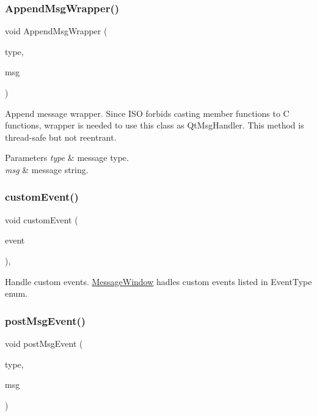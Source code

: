 \subsubsection{\texorpdfstring{AppendMsgWrapper()}{AppendMsgWrapper()}}
{\footnotesize\ttfamily void Append\+Msg\+Wrapper (\begin{DoxyParamCaption}\item[{Qt\+Msg\+Type}]{type,  }\item[{const char $\ast$}]{msg }\end{DoxyParamCaption})\hspace{0.3cm}{\ttfamily [static]}}

Append message wrapper. Since I\+SO forbids casting member functions to C functions, wrapper is needed to use this class as Qt\+Msg\+Handler. This method is thread-\/safe but not reentrant. 
\begin{DoxyParams}{Parameters}
{\em type} & message type. \\
\hline
{\em msg} & message string. \\
\hline
\end{DoxyParams}
\mbox{\label{class_message_window_a51bccb823537d2f7961a4578a5363aec}} 
\subsubsection{\texorpdfstring{customEvent()}{customEvent()}}
{\footnotesize\ttfamily void custom\+Event (\begin{DoxyParamCaption}\item[{Q\+Event $\ast$}]{event }\end{DoxyParamCaption})\hspace{0.3cm}{\ttfamily [protected]}, {\ttfamily [virtual]}}

Handle custom events. \mbox{\hyperlink{class_message_window}{Message\+Window}} hadles custom events listed in Event\+Type enum. \mbox{\label{class_message_window_aaa2d5aa4658897bb5a2e04ba9e318874}} 
\subsubsection{\texorpdfstring{postMsgEvent()}{postMsgEvent()}}
{\footnotesize\ttfamily void post\+Msg\+Event (\begin{DoxyParamCaption}\item[{Qt\+Msg\+Type}]{type,  }\item[{const char $\ast$}]{msg }\end{DoxyParamCaption})}

